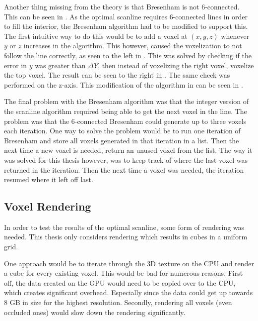Another thing missing from the theory is that Bresenham is not 6-connected.
This can be seen in .
As the optimal scanline requires 6-connected lines in order to fill the interior, the Bresenham algorithm had to be modified to support this.
The first intuitive way to do this would be to add a voxel at $(x,y,z)$ whenever $y$ or $z$ increases in the algorithm.
This however, caused the voxelization to not follow the line correctly, as seen to the left in .
This was solved by checking if the error in $y$ was greater than $\Delta Y$, then instead of voxelizing the right voxel, voxelize the top voxel.
The result can be seen to the right in .
The same check was performed on the z-axis.
This modification of the algorithm in  can be seen in .

The final problem with the Bresenham algorithm was that the integer version of the scanline algorithm required being able to get the next voxel in the line.
The problem was that the 6-connected Bresenham could generate up to three voxels each iteration.
One way to solve the problem would be to run one iteration of Bresenham and store all voxels generated in that iteration in a list.
Then the next time a new voxel is needed, return an unused voxel from the list.
The way it was solved for this thesis however, was to keep track of where the last voxel was returned in the iteration.
Then the next time a voxel was needed, the iteration resumed where it left off last.





\subsection{Voxel Rendering}\label{ss:voxel_rendering}
In order to test the results of the optimal scanline, some form of rendering was needed.
This thesis only considers rendering which results in cubes in a uniform grid.

One approach would be to iterate through the 3D texture on the CPU and render a cube for every existing voxel.
This would be bad for numerous reasons.
First off, the data created on the GPU would need to be copied over to the CPU, which creates significant overhead.
Especially since the data could get up towards 8 GB in size for the highest resolution.
Secondly, rendering all voxels (even occluded ones) would slow down the rendering significantly.


